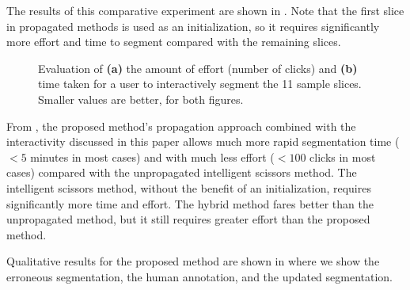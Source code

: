 \documentclass[]{spie}  %
\begin{document}
The results of this comparative experiment are shown in .
Note that the first slice in propagated methods is used as an
initialization, so it requires significantly more effort and time to
segment compared with the remaining slices.
\begin{figure}[htbp]
\centering
{}
\hspace{0.1em}
\caption{Evaluation of \textbf{(a)} the amount of effort (number of
  clicks) and \textbf{(b)} time taken for a user to interactively
  segment the 11 sample slices.  Smaller values are better, for both
  figures.} \label{fig:ex}
\end{figure}
From , the proposed method's propagation approach combined
with the interactivity discussed in this paper allows much more rapid
segmentation time ($< 5$ minutes in most cases) and with much less
effort ($< 100$ clicks in most cases) compared with the unpropagated
intelligent scissors method.  The intelligent scissors method, without
the benefit of an initialization, requires significantly more time and
effort.  The hybrid method fares better than the unpropagated method,
but it still requires greater effort than the proposed method.

Qualitative results for the proposed method are shown in 
where we show the erroneous segmentation, the human annotation, and
the updated segmentation.
\end{document}
